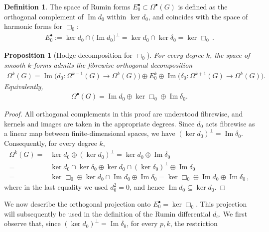 \documentclass[dvipsnames]{amsart}
\newtheorem{proposition}[theorem]{Proposition}
\theoremstyle{definition}
\newtheorem{definition}[theorem]{Definition}
\theoremstyle{definition}
\numberwithin{equation}{section}
\begin{document}
\begin{definition}
    The space of Rumin forms $E_0^\bullet\subset \Omega^\bullet(G)$ is defined as the orthogonal complement of $\operatorname{Im}d_0$ within $\ker d_0$, and coincides with the space of harmonic forms for $\Box_0$:
    \begin{align*}
        E_0^\bullet:=\ker d_0\cap\big(\operatorname{Im}d_0\big)^\perp=\ker d_0\cap\ker \delta_0=\ker\Box_0\,.
    \end{align*}
\end{definition}

\begin{proposition}[Hodge decomposition for $\Box_0$]
For every degree $k$, the space of smooth $k$-forms admits the fibrewise orthogonal decomposition
\begin{align}\label{eq: Hodge decomp Box_0 degree}
\Omega^k(G)
=
\operatorname{Im}\bigl(
d_0\colon\Omega^{k-1}(G)\to\Omega^k(G)
\bigr)
\oplus
E_0^k
\oplus
\operatorname{Im}\bigl(
\delta_0\colon\Omega^{k+1}(G)\to\Omega^k(G)
\bigr).
\end{align}
Equivalently,
\begin{align}\label{eq: Hodge decomp Box_0}
\Omega^\bullet(G)
=
\operatorname{Im}d_0
\oplus
\ker\Box_0
\oplus
\operatorname{Im}\delta_0.
\end{align}
\end{proposition}
\begin{proof}
All orthogonal complements in this proof are understood fibrewise, and kernels and images are taken in the appropriate degrees. Since $d_0$ acts fibrewise as a linear map between finite-dimensional spaces, we have 
$(\ker d_0)^\perp=\operatorname{Im}\delta_0$.
Consequently, for every degree $k$,
        \begin{align*}
            \Omega^k(G)=&\ker d_0\oplus(\ker d_0)^\perp=\ker d_0\oplus\operatorname{Im}\delta_0\\=&\ker d_0\cap\ker \delta_0\oplus\ker d_0\cap(\ker \delta_0)^\perp\oplus\operatorname{Im}\delta_0\\=&\ker\Box_0\oplus\ker d_0\cap\operatorname{Im}d_0\oplus\operatorname{Im}\delta_0=\ker\Box_0\oplus\operatorname{Im}d_0\oplus\operatorname{Im}\delta_0\,,
        \end{align*}
        where in the last equality we used $d_0^2=0$, and hence $\operatorname{Im}d_0\subseteq\ker d_0$.
    \end{proof}
We now describe the orthogonal projection onto $E_0^\bullet = \ker \Box_0$. This projection will subsequently be used in the definition of the Rumin differential $d_c$. We first observe that, since $(\ker d_0)^\perp = \operatorname{Im} \delta_0$, for every $p,k$, the restriction
\end{document}
